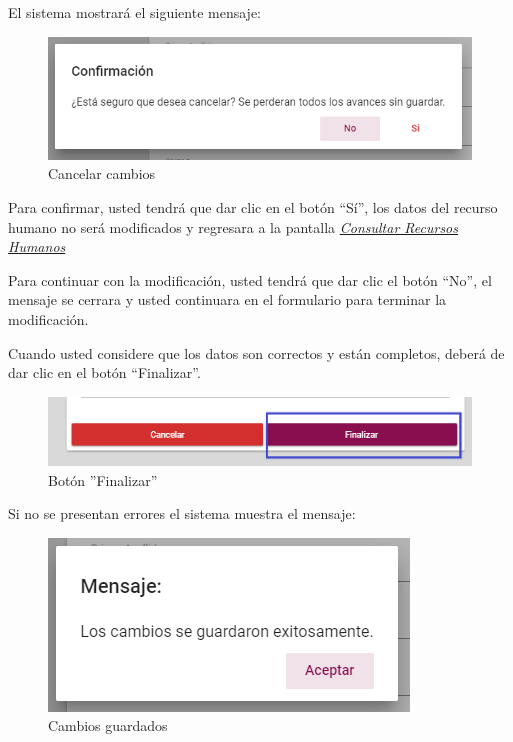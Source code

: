                 El sistema mostrará el siguiente mensaje:
                  \clearpage
                 \begin{figure}[!hbtp]
                    \centering
                    \includegraphics[width=0.4\linewidth]{images/SP1/MSG29}
                    \caption{Cancelar cambios}
                    \label{mensaje29}
             
                \end{figure}
              
                Para confirmar, usted tendrá que dar clic en el botón “Sí”, los datos del recurso humano no será modificados  y regresara a la pantalla \hyperlink{consultarRH}{\textit{Consultar Recursos Humanos}}
            
                Para continuar con la modificación, usted tendrá que  dar clic el botón “No”, el mensaje se cerrara y usted continuara en el formulario para terminar la modificación.
                
                Cuando usted considere que los datos son correctos y están completos, deberá de dar clic en el botón “Finalizar”.
                \begin{figure}[!hbtp]
                    \centering
                    \hypertarget{btnfin}{\includegraphics[width=0.7\linewidth]{images/SP1/BtnFinalizar}}
                    \caption{Botón ''Finalizar''}
                    \label{btnfin}
                \end{figure}
                
                Si no se presentan errores el sistema muestra el mensaje:
                    
                 \begin{figure}[!hbtp]
                    \centering
                    \includegraphics[width=0.4\linewidth]{images/SP1/MSG31}
                    \caption{Cambios guardados}
                    \label{mensaje31}
                    
                \end{figure}
                
